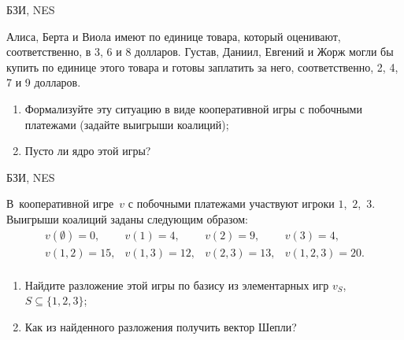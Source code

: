 \begin{problem} \begin{source}
БЗИ, NES
\end{source} Алиса, Берта и Виола имеют по
единице товара, который оценивают, соответственно, в 3, 6 и
8 долларов. Густав, Даниил, Евгений и Жорж могли бы купить
по единице этого товара и готовы заплатить за него,
соответственно, 2, 4, 7 и 9 долларов.
\begin{enumerate}
  \item Формализуйте эту ситуацию в виде кооперативной игры с
  побочными платежами (задайте выигрыши коалиций);
  \item Пусто ли ядро этой игры?
\end{enumerate}







\begin{sol}

\end{sol}
\end{problem}




\begin{problem} \begin{source}
БЗИ, NES
\end{source}
В~кооперативной игре~$v$ с побочными платежами участвуют
игроки $1$,~$2$,~$3$. Выигрыши коалиций заданы следующим
образом:
\[\begin{array}{llll}
  v(\emptyset)=0, & v(1)=4,&v(2)=9,&v(3)=4,\\
  v(1,2)=15,&v(1,3)=12,&v(2,3)=13,&v(1,2,3)=20.\\
\end{array}\]
\begin{enumerate}
  \item Найдите разложение этой игры по базису из элементарных игр
  $v_S$, $S\subseteq\{1,2,3\}$;
  \item Как из найденного разложения получить вектор Шепли?
\end{enumerate}







\begin{sol}

\end{sol}
\end{problem}



